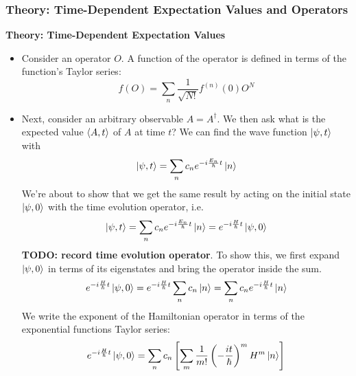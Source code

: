 \documentclass[11pt, a4paper]{article}
\begin{document}
\subsubsection{Theory: Time-Dependent Expectation Values and Operators}
\textbf{Theory: Time-Dependent Expectation Values} 
\begin{itemize}
	\item Consider an operator $ O $. A function of the operator is defined in terms of the function's Taylor series:
	\begin{equation*}
		f(O) = \sum_{n} \frac{1}{\sqrt{N!}}f^{(n)}(0)O^{N}
	\end{equation*}

	\item Next, consider an arbitrary observable $ A = A^{\dagger} $. We then ask what is the expected value $ \ev{A, t} $ of $ A $ at time $ t $? We can find the wave function $ \ket{\psi, t} $ with
	\begin{equation*}
		\ket{\psi, t} = \sum_{n} c_{n}e^{-i \frac{E_{n}}{\hbar}t}\ket{n}
	\end{equation*}
	We're about to show that we get the same result by acting on the initial state $ \ket{\psi, 0} $ with the time evolution operator, i.e. 
	\begin{equation*}
		\ket{\psi, t} = \sum_{n} c_{n}e^{-i \frac{E_{n}}{\hbar}t}\ket{n} = e^{-i\frac{H}{\hbar}t}\ket{\psi, 0}
	\end{equation*}
	\textbf{TODO: record time evolution operator}. To show this, we first expand $ \ket{\psi, 0} $ in terms of its eigenstates and bring the operator inside the sum.
	\begin{equation*}
		 e^{-i\frac{H}{\hbar}t}\ket{\psi, 0} =  e^{-i\frac{H}{\hbar}t}\sum_{n}c_{n}\ket{n} = \sum_{n}c_{n}e^{-i\frac{H}{\hbar}t}\ket{n}
	\end{equation*}
	We write the exponent of the Hamiltonian operator in terms of the exponential functions Taylor series:
	\begin{equation*}
		e^{-i\frac{H}{\hbar}t}\ket{\psi, 0}  = \sum_{n}c_{n} \left[\sum_{m}\frac{1}{m!}\left (-\frac{it}{\hbar}\right )^{m}H^{m}\ket{n}\right]
	\end{equation*}
	

\end{itemize}
\end{document}
